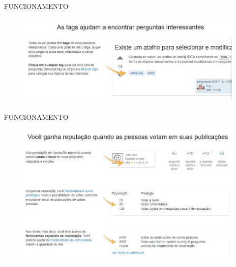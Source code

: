 \documentclass{Alexandre}
\begin{document}
\begin{frame}{FUNCIONAMENTO}

    \begin{figure}
        \includegraphics[scale = 0.45]{Figuras/StackOverflow-Etiquetas.jpg}
    \end{figure}

\end{frame}


\begin{frame}{FUNCIONAMENTO}

    \begin{figure}
        \includegraphics[scale = 0.35]{Figuras/StackOverflow-Recompensa.jpg}
    \end{figure}

\end{frame}
\end{document}
